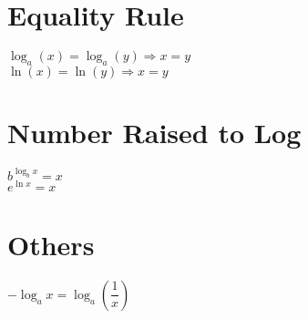 \documentclass{article}
\begin{document}
\section{Equality Rule}
\begin{multicols}{2}
    $\log_a(x) = \log_a(y) \Rightarrow x=y$ \\ $\ln(x) = \ln(y) \Rightarrow x = y$
\end{multicols}

\section{Number Raised to Log}
\begin{multicols}{2}
    $b^{\log_bx} = x$ \\ $e^{\ln x} = x$
\end{multicols}

\section{Others}
\begin{multicols}{2}
    $-\log_ax=\log_a \left(\dfrac{1}{x}\right)$
\end{multicols}
\end{document}
